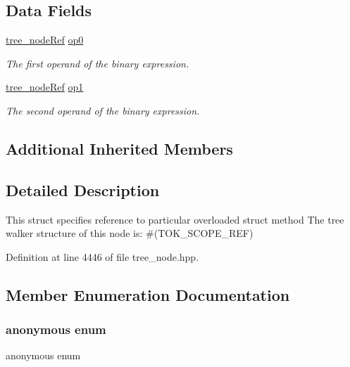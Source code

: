 \subsection*{Data Fields}
\begin{DoxyCompactItemize}
\item 
\hyperlink{tree__node_8hpp_a6ee377554d1c4871ad66a337eaa67fd5}{tree\+\_\+node\+Ref} \hyperlink{structscope__ref_a9e3f01d573f4326a7efdec6f3139eed7}{op0}
\begin{DoxyCompactList}\small\item\em The first operand of the binary expression. \end{DoxyCompactList}\item 
\hyperlink{tree__node_8hpp_a6ee377554d1c4871ad66a337eaa67fd5}{tree\+\_\+node\+Ref} \hyperlink{structscope__ref_a054cd6e86555615a6973424a8fb57945}{op1}
\begin{DoxyCompactList}\small\item\em The second operand of the binary expression. \end{DoxyCompactList}\end{DoxyCompactItemize}
\subsection*{Additional Inherited Members}


\subsection{Detailed Description}
This struct specifies reference to particular overloaded struct method The tree walker structure of this node is\+: \#(T\+O\+K\+\_\+\+S\+C\+O\+P\+E\+\_\+\+R\+EF) 

Definition at line 4446 of file tree\+\_\+node.\+hpp.



\subsection{Member Enumeration Documentation}
\mbox{\label{structscope__ref_aa93f4d3dc24c061ec33661afc980402a}} 
\subsubsection{\texorpdfstring{anonymous enum}{anonymous enum}}
{\footnotesize\ttfamily anonymous enum}



